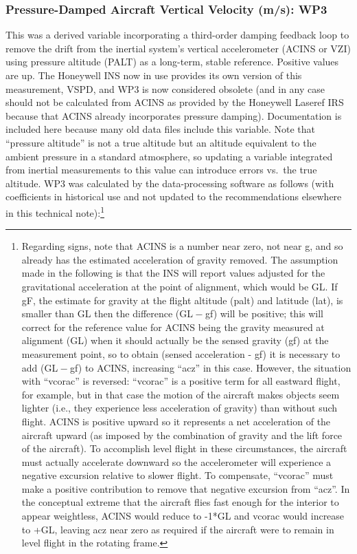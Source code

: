 \documentclass[
  english,
]{book}
\begin{document}
\hypertarget{wp3}{%
\subsubsection*{Pressure-Damped Aircraft Vertical Velocity (m/s): WP3}\label{wp3}}

\protect\hypertarget{WP3ux20algorithm}{}{}This was a derived variable incorporating a third-order damping feedback loop to remove the drift from the inertial system's vertical accelerometer (ACINS or VZI) using pressure altitude (PALT) as a long-term, stable reference. Positive values are up. The Honeywell INS now in use provides its own version of this measurement, VSPD, and WP3 is now considered obsolete (and in any case should not be calculated from ACINS as provided by the Honeywell Laseref IRS because that ACINS already incorporates pressure damping). Documentation is included here because many old data files include this variable. Note that ``pressure altitude'' is not a true altitude but an altitude equivalent to the ambient pressure in a standard atmosphere, so updating a variable integrated from inertial measurements to this value can introduce errors vs.~the true altitude. WP3 was calculated by the data-processing software as follows (with coefficients in historical use and not updated to the recommendations elsewhere in this technical note):\footnote{Regarding signs, note that ACINS is a number near zero, not near g, and so already has the estimated acceleration of gravity removed. The assumption made in the following is that the INS will report values adjusted for the gravitational acceleration at the point of alignment, which would be {GL}. If {gF}, the estimate for gravity at the flight altitude (palt) and latitude (lat), is smaller than {GL} then the difference ({GL − gf}) will be positive; this will correct for the reference value for ACINS being the gravity measured at alignment ({GL}) when it should actually be the sensed gravity ({gf}) at the measurement point, so to obtain (sensed acceleration - {gf}) it is necessary to add ({GL − gf}) to ACINS, increasing ``acz'' in this case. However, the situation with ``vcorac'' is reversed: ``vcorac'' is a positive term for all eastward flight, for example, but in that case the motion of the aircraft makes objects seem lighter (i.e., they experience less acceleration of gravity) than without such flight. ACINS is positive upward so it represents a net acceleration of the aircraft upward (as imposed by the combination of gravity and the lift force of the aircraft). To accomplish level flight in these circumstances, the aircraft must actually accelerate downward so the accelerometer will experience a negative excursion relative to slower flight. To compensate, ``vcorac'' must make a positive contribution to remove that negative excursion from ``acz''. In the conceptual extreme that the aircraft flies fast enough for the interior to appear weightless, ACINS would reduce to -1*{GL} and vcorac would increase to +{GL}, leaving acz near zero as required if the aircraft were to remain in level flight in the rotating frame.}
\end{document}
